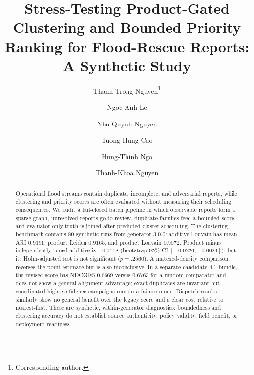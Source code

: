 \documentclass[runningheads]{llncs}
\begin{document}
\title{Stress-Testing Product-Gated Clustering and Bounded Priority Ranking
for Flood-Rescue Reports: A Synthetic Study}

\author{Thanh-Trong Nguyen\thanks{Corresponding author.} \and
Ngoc-Anh Le \and
Nhu-Quynh Nguyen \and
Tuong-Hung Cao \and
Hung-Thinh Ngo \and
Thanh-Khoa Nguyen}

\maketitle

\begin{abstract}
Operational flood streams contain duplicate, incomplete, and adversarial
reports, while clustering and priority scores are often evaluated without
measuring their scheduling consequences. We audit a fail-closed batch
pipeline in which observable reports form a sparse graph, unresolved reports
go to review, duplicate families feed a bounded score, and evaluator-only
truth is joined after predicted-cluster scheduling. The clustering benchmark
contains 80 synthetic runs from generator 3.0.0: additive Louvain has mean
ARI $0.9191$, product Leiden $0.9165$, and product Louvain $0.9072$.
Product minus independently tuned additive is $-0.0118$ (bootstrap 95\% CI
$[-0.0226,-0.0024]$), but its Holm-adjusted test is not significant
($p=.2560$). A matched-density comparison reverses the point estimate but is
also inconclusive. In a separate candidate-4.1 bundle, the revised score has
NDCG@5 $0.6669$ versus $0.6763$ for a random comparator and does not show a
general alignment advantage; exact duplicates are invariant but coordinated
high-confidence campaigns remain a failure mode. Dispatch results similarly
show no general benefit over the legacy score and a clear cost relative to
nearest-first. These are synthetic, within-generator diagnostics:
boundedness and clustering accuracy do not establish source authenticity,
policy validity, field benefit, or deployment readiness.
\end{abstract}
\end{document}
